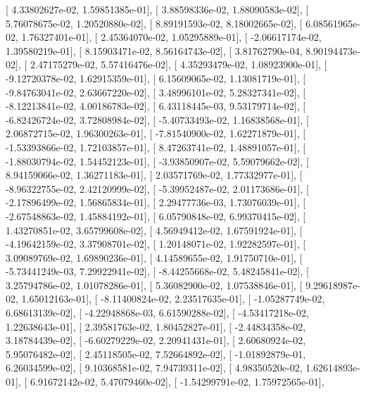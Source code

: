 \documentclass{article}
\begin{document}
       [  4.33802627e-02,   1.59851385e-01],
       [  3.88598336e-02,   1.88090583e-02],
       [  5.76078675e-02,   1.20520880e-02],
       [  8.89191593e-02,   8.18002665e-02],
       [  6.08561965e-02,   1.76327401e-01],
       [  2.45364070e-02,   1.05295889e-01],
       [ -2.06617174e-02,   1.39580219e-01],
       [  8.15903471e-02,   8.56164743e-02],
       [  3.81762790e-04,   8.90194473e-02],
       [  2.47175279e-02,   5.57416476e-02],
       [  4.35293479e-02,   1.08923900e-01],
       [ -9.12720378e-02,   1.62915359e-01],
       [  6.15609065e-02,   1.13081719e-01],
       [ -9.84763041e-02,   2.63667220e-02],
       [  3.48996101e-02,   5.28327341e-02],
       [ -8.12213841e-02,   4.00186783e-02],
       [  6.43118445e-03,   9.53179714e-02],
       [ -6.82426724e-02,   3.72808984e-02],
       [ -5.40733493e-02,   1.16838568e-01],
       [  2.06872715e-02,   1.96300263e-01],
       [ -7.81540900e-02,   1.62271879e-01],
       [ -1.53393866e-02,   1.72103857e-01],
       [  8.47263741e-02,   1.48891057e-01],
       [ -1.88030794e-02,   1.54452123e-01],
       [ -3.93850907e-02,   5.59079662e-02],
       [  8.94159066e-02,   1.36271183e-01],
       [  2.03571769e-02,   1.77332977e-01],
       [ -8.96322755e-02,   2.42120999e-02],
       [ -5.39952487e-02,   2.01173686e-01],
       [ -2.17896499e-02,   1.56865834e-01],
       [  2.29477736e-03,   1.73076039e-01],
       [ -2.67548863e-02,   1.45884192e-01],
       [  6.05790848e-02,   6.99370415e-02],
       [  1.43270851e-02,   3.65799608e-02],
       [  4.56949412e-02,   1.67591924e-01],
       [ -4.19642159e-02,   3.37908701e-02],
       [  1.20148071e-02,   1.92282597e-01],
       [  3.09089769e-02,   1.69890236e-01],
       [  4.14589655e-02,   1.91750710e-01],
       [ -5.73441249e-03,   7.29922941e-02],
       [ -8.44255668e-02,   5.48245841e-02],
       [  3.25794786e-02,   1.01078286e-01],
       [  5.36082900e-02,   1.07538846e-01],
       [  9.29618987e-02,   1.65012163e-01],
       [ -8.11400824e-02,   2.23517635e-01],
       [ -1.05287749e-02,   6.68613139e-02],
       [ -4.22948868e-03,   6.61590288e-02],
       [ -4.53417218e-02,   1.22638643e-01],
       [  2.39581763e-02,   1.80452827e-01],
       [ -2.44834358e-02,   3.18784439e-02],
       [ -6.60279229e-02,   2.20941431e-01],
       [  2.60680924e-02,   5.95076482e-02],
       [  2.45118505e-02,   7.52664892e-02],
       [ -1.01892879e-01,   6.26034599e-02],
       [  9.10368581e-02,   7.94739311e-02],
       [  4.98350520e-02,   1.62614893e-01],
       [  6.91672142e-02,   5.47079460e-02],
       [ -1.54299791e-02,   1.75972565e-01],
\end{document}
